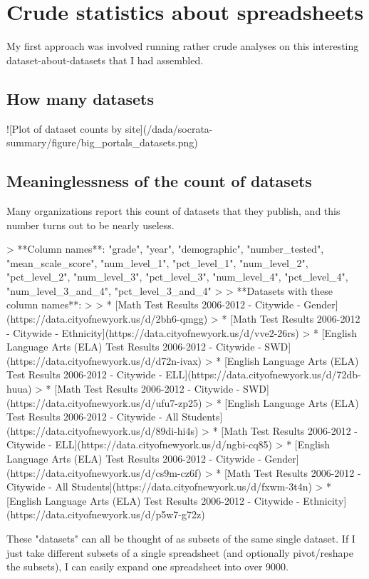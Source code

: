 \documentclass{acm_proc_article-sp}
\begin{document}
\section{Crude statistics about spreadsheets}
My first approach was involved running rather crude analyses on this
interesting dataset-about-datasets that I had assembled.

\subsection{How many datasets}
![Plot of dataset counts by site](/dada/socrata-summary/figure/big_portals_datasets.png)

\subsection{Meaninglessness of the count of datasets}

Many organizations report this count of datasets that they publish, and this number
turns out to be nearly useless.

> **Column names**: "grade", "year", "demographic", "number_tested", "mean_scale_score", "num_level_1", "pct_level_1", "num_level_2", "pct_level_2", "num_level_3", "pct_level_3", "num_level_4", "pct_level_4", "num_level_3_and_4", "pct_level_3_and_4"
>
> **Datasets with these column names**:
>
> * [Math Test Results 2006-2012 - Citywide - Gender](https://data.cityofnewyork.us/d/2bh6-qmgg)
> * [Math Test Results 2006-2012 - Citywide - Ethnicity](https://data.cityofnewyork.us/d/vve2-26rs)
> * [English Language Arts (ELA) Test Results 2006-2012 - Citywide - SWD](https://data.cityofnewyork.us/d/d72n-ivax)
> * [English Language Arts (ELA) Test Results 2006-2012 - Citywide - ELL](https://data.cityofnewyork.us/d/72db-huua)
> * [Math Test Results 2006-2012 - Citywide - SWD](https://data.cityofnewyork.us/d/ufu7-zp25)
> * [English Language Arts (ELA) Test Results 2006-2012 - Citywide - All Students](https://data.cityofnewyork.us/d/89di-hi4s)
> * [Math Test Results 2006-2012 - Citywide - ELL](https://data.cityofnewyork.us/d/ngbi-cq85)
> * [English Language Arts (ELA) Test Results 2006-2012 - Citywide - Gender](https://data.cityofnewyork.us/d/cs9m-cz6f)
> * [Math Test Results 2006-2012 - Citywide - All Students](https://data.cityofnewyork.us/d/fxwm-3t4n)
> * [English Language Arts (ELA) Test Results 2006-2012 - Citywide - Ethnicity](https://data.cityofnewyork.us/d/p5w7-g72z)

These "datasets" can all be thought of as subsets of the same single dataset.
If I just take different subsets of a single spreadsheet (and optionally
pivot/reshape the subsets), I can easily expand one spreadsheet into over 9000.
\end{document}
